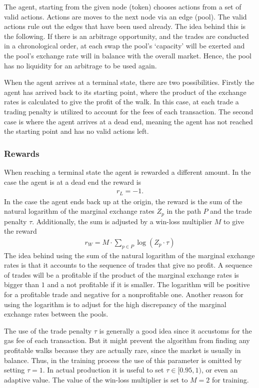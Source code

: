 The agent, starting from the given node (token) chooses actions from a set of
valid actions. Actions are moves to the next node via an edge (pool). The
valid actions rule out the edges that have been used already. The idea behind
this is the following. If there is an arbitrage opportunity, and the trades
are conducted in a chronological order, at each swap the pool's `capacity'
will be exerted and the pool's exchange rate will in balance with the overall
market. Hence, the pool has no liquidity for an arbitrage to be used again.
\newline

When the agent arrives at a terminal state, there are two possibilities.
Firstly the agent has arrived back to its starting point, where the product
of the exchange rates is calculated to give the profit of the walk. In this
case, at each trade a trading penalty is utilized to account for the fees
of each transaction. The second case is where the agent arrives at a dead
end, meaning the agent has not reached the starting point and has no valid
actions left.

\subsubsection{Rewards}
When reaching a terminal state the agent is rewarded a different amount. In
the case the agent is at a dead end the reward is
\begin{align}
    r_L = -1.
\end{align}
In the case the agent ends back up at the origin, the reward is the sum of
the natural logarithm of the marginal exchange rates $Z_p$ in the path $P$
and the trade penalty $\tau$. Additionally, the sum is adjusted by a
win-loss multiplier $M$ to give the reward
\begin{align}
    r_W = M \cdot \sum_{p \in P} \log(Z_p \cdot \tau)
\end{align}
The idea behind using the sum of the natural logarithm of the marginal
exchange rates is that it accounts to the sequence of trades that give no
profit. A sequence of trades will be a profitable if the product of the
marginal exchange rates is bigger than $1$ and a not profitable if it is
smaller. The logarithm will be positive for a profitable trade and negative
for a nonprofitable one. Another reason for using the logarithm is to adjust
for the high discrepancy of the marginal exchange rates between the pools.
\newline

The use of the trade penalty $\tau$ is generally a good idea since it
accustoms for the gas fee of each transaction. But it might prevent the
algorithm from finding any profitable walks because they are actually rare,
since the market is usually in balance. Thus, in the training process the use
of this parameter is omitted by setting $\tau = 1$. In actual production it
is useful to set $\tau \in [0.95, 1)$, or even an adaptive value. The value
of the win-loss multiplier is set to $M=2$ for training.

